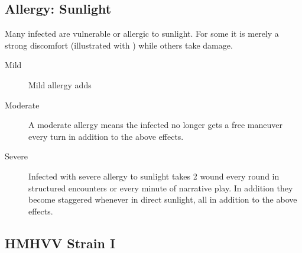 \documentclass{book}
\begin{document}
\begin{multicols}{2}
 \subsection{Allergy: Sunlight}
 \label{allergysunlight}
 Many infected are vulnerable or allergic to sunlight. For some it is merely a strong discomfort (illustrated with \SetbackDie \SetbackDie) while others take damage. 
 
\begin{description}
	\item[Mild] Mild allergy adds \SetbackDie \SetbackDie 
	\item[Moderate] A moderate allergy means the infected no longer gets a free maneuver every turn in addition to the above effects.
	\item[Severe] Infected with severe allergy to sunlight takes 2 wound every round in structured encounters or every minute of narrative play. In addition they become staggered whenever in direct sunlight, all in addition to the above effects.
\end{description} 
	
\end{multicols}

\subsection{HMHVV Strain I}
\end{document}
